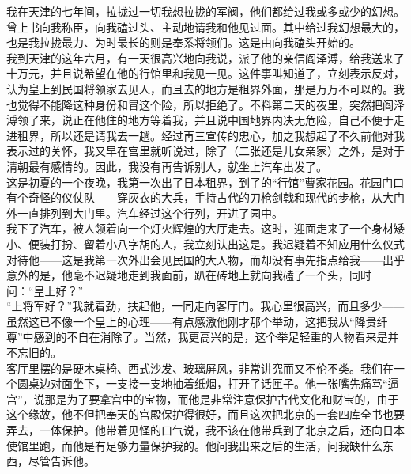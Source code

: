 我在天津的七年间，拉拢过一切我想拉拢的军阀，他们都给过我或多或少的幻想。曾上书向我称臣，向我磕过头、主动地请我和他见过面。其中给过我幻想最大的，也是我拉拢最力、为时最长的则是奉系将领们。这是由向我磕头开始的。\\

我到天津的这年六月，有一天很高兴地向我说，派了他的亲信阎泽溥，给我送来了十万元，并且说希望在他的行馆里和我见一见。这件事叫知道了，立刻表示反对，认为皇上到民国将领家去见人，而且去的地方是租界外面，那是万万不可以的。我也觉得不能降这种身份和冒这个险，所以拒绝了。不料第二天的夜里，突然把阎泽溥领了来，说正在他住的地方等着我，并且说中国地界内决无危险，自己不便于走进租界，所以还是请我去一趟。经过再三宣传的忠心，加之我想起了不久前他对我表示过的关怀，我又早在宫里就听说过，除了（二张还是儿女亲家）之外，是对于清朝最有感情的。因此，我没有再告诉别人，就坐上汽车出发了。\\

这是初夏的一个夜晚，我第一次出了日本租界，到了的“行馆”曹家花园。花园门口有个奇怪的仪仗队——穿灰衣的大兵，手持古代的刀枪剑戟和现代的步枪，从大门外一直排列到大门里。汽车经过这个行列，开进了园中。\\

我下了汽车，被人领着向一个灯火辉煌的大厅走去。这时，迎面走来了一个身材矮小、便装打扮、留着小八字胡的人，我立刻认出这是。我迟疑着不知应用什么仪式对待他——这是我第一次外出会见民国的大人物，而却没有事先指点给我——出乎意外的是，他毫不迟疑地走到我面前，趴在砖地上就向我磕了一个头，同时问：“皇上好？”\\

“上将军好？”我就着劲，扶起他，一同走向客厅门。我心里很高兴，而且多少——虽然这已不像一个皇上的心理——有点感激他刚才那个举动，这把我从“降贵纤尊”中感到的不自在消除了。当然，我更高兴的是，这个举足轻重的人物看来是并不忘旧的。\\

客厅里摆的是硬木桌椅、西式沙发、玻璃屏风，非常讲究而又不伦不类。我们在一个圆桌边对面坐下，一支接一支地抽着纸烟，打开了话匣子。他一张嘴先痛骂“逼宫”，说那是为了要拿宫中的宝物，而他是非常注意保护古代文化和财宝的，由于这个缘故，他不但把奉天的宫殿保护得很好，而且这次把北京的一套四库全书也要弄去，一体保护。他带着见怪的口气说，我不该在他带兵到了北京之后，还向日本使馆里跑，而他是有足够力量保护我的。他问我出来之后的生活，问我缺什么东西，尽管告诉他。\\

